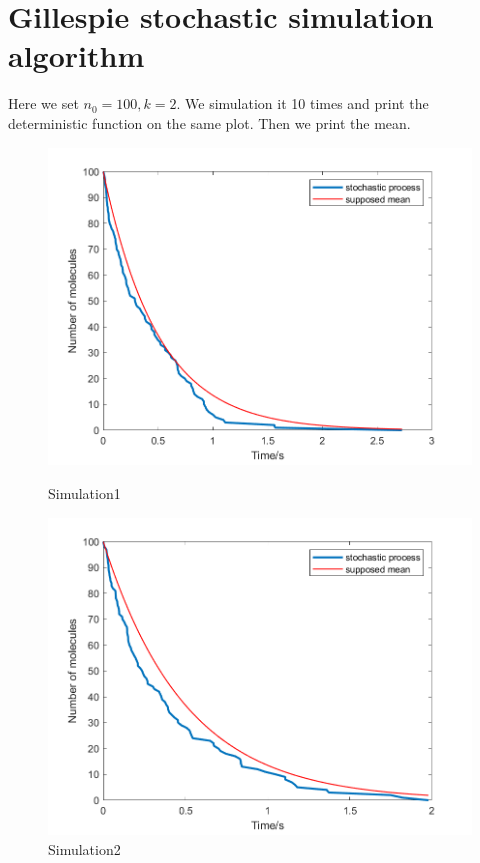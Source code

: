 \documentclass{article}
\begin{document}
\section{Gillespie stochastic simulation algorithm}
Here we set $n_0=100,k=2$. We simulation it 10 times and print the deterministic function on the same plot. Then we print the mean.
\begin{figure}[htbp]
    \centering
    \begin{minipage}{0.45\linewidth}
        \centering
        \includegraphics[width=\linewidth]{graph/b1.png}
        \caption{Simulation1}
        \label{b1}
    \end{minipage}
    \hfill
    \begin{minipage}{0.45\linewidth}
        \centering
        \includegraphics[width=\linewidth]{graph/b2.png}
        \caption{Simulation2}
        \label{b2}
    \end{minipage}
\end{figure}
\end{document}
